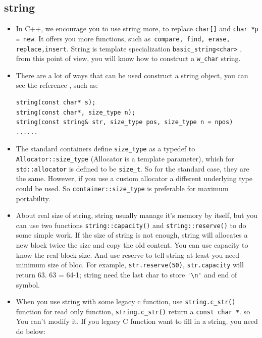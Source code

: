 \documentclass[a4paper,11pt,twoside]{book}
\begin{document}
\subsection{string}
\begin{itemize}
	\item In C++, we encourage you to use string more, to replace \texttt{char[]} and \texttt{char *p = new}.  It offers you more functions, such as\texttt{ compare, find, erase, replace,insert}. String is template specialization \texttt{basic\_string<char>} , from this point of view, you will know how to construct a \texttt{w\_char} string.
	
	
	\item There are a lot of ways that can be used construct a string object, you can see the reference , such as:
\begin{lstlisting}[numbers=none]
string(const char* s);
string(const char*, size_type n);
string(const string& str, size_type pos, size_type n = npos)
......
\end{lstlisting}
	
	\item The standard containers define \texttt{size\_type} as a typedef to \texttt{Allocator::size\_type} (Allocator is a template parameter), which for \texttt{std::allocator} is defined to be \texttt{size\_t}. So for the standard case, they are the same. However, if you use a custom allocator a different underlying type could be used. So \texttt{container::size\_type} is preferable for maximum portability.
		
	\item About real size of string, string usually manage it's memory by itself, but you can use two functions \texttt{string::capacity()} and \texttt{string::reserve()} to do some simple work. If the size of string is not enough, string will allocates a new block twice the size and copy the old content. You can use capacity to know the real block size. And use reserve to tell string at least you need minimum size of bloc. For example, \texttt{str.reserve(50)},  \texttt{str.capacity} will return 63. 63 = 64-1; string need the last char to store \verb='\n'= and end of symbol.
	
	\item When you use string with some legacy c function, use \texttt{string.c\_str()} function for read only function, \texttt{string.c\_str()} return a \texttt{const char *}. so You can't modify it. If you legacy C function want to fill in a string. you need do below:
	

\end{itemize}
\end{document}

